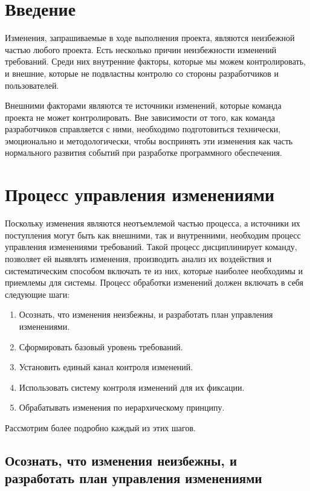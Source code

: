 \documentclass[a4paper,14pt]{extarticle}
\begin{document}


\section*{Введение}
Изменения, запрашиваемые в ходе выполнения проекта, являются неизбежной частью
любого проекта. Есть несколько причин неизбежности изменений требований. Среди
них внутренние факторы, которые мы можем контролировать, и внешние, которые не
подвластны контролю со стороны разработчиков и пользователей.

Внешними факторами являются те источники изменений, которые команда проекта не
может контролировать. Вне зависимости от того, как команда разработчиков
справляется с ними, необходимо подготовиться технически, эмоционально и
методологически, чтобы воспринять эти изменения как часть нормального развития
событий при разработке программного обеспечения.
\pagebreak

\section{Процесс управления изменениями}
Поскольку изменения являются неотъемлемой частью процесса, а источники их
поступления могут быть как внешними, так и внутренними, необходим процесс
управления изменениями требований. Такой процесс дисциплинирует команду,
позволяет ей выявлять изменения, производить анализ их воздействия и
систематическим способом включать те из них, которые наиболее необходимы и
приемлемы для системы. Процесс обработки изменений должен включать в себя
следующие шаги:

\begin{enumerate}
    \item Осознать, что изменения неизбежны, и разработать план управления
          изменениями.
    \item Сформировать базовый уровень требований.
    \item Установить единый канал контроля изменений.
    \item Использовать систему контроля изменений для их фиксации.
    \item Обрабатывать изменения по иерархическому принципу.
\end{enumerate}

Рассмотрим более подробно каждый из этих шагов.

\subsection{Осознать, что изменения неизбежны, и разработать план управления
изменениями}
\end{document}
